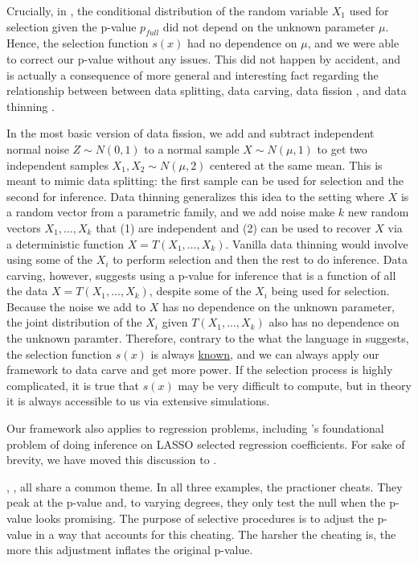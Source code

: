 \documentclass{article}
\begin{document}
Crucially, in , the conditional distribution of the random variable $X_1$ used for selection given the p-value $p_{full}$ did not depend on the unknown parameter $\mu$. Hence, the selection function $s(x)$ had no dependence on $\mu$, and we were able to correct our p-value without any issues. This did not happen by accident, and is actually a consequence of more general and interesting fact regarding the relationship between between data splitting, data carving, data fission \citep{Leiner}, and data thinning \citep{Dharamshi, Neufeld}.

In the most basic version of data fission, we add and subtract independent normal noise $Z \sim N(0, 1)$ to a normal sample $X \sim N(\mu, 1)$ to get two independent samples $X_1, X_2 \sim N(\mu, 2)$ centered at the same mean. This is meant to mimic data splitting: the first sample can be used for selection and the second for inference. Data thinning generalizes this idea to the setting where $X$ is a random vector from a parametric family, and we add noise make $k$ new random vectors $X_1, \dots, X_k$ that (1) are independent and (2) can be used to recover $X$ via a deterministic function $X = T(X_1, \dots, X_k)$. Vanilla data thinning would involve using some of the $X_i$ to perform selection and then the rest to do inference. Data carving, however, suggests using a p-value for inference that is a function of all the data $X = T(X_1, \dots, X_k)$, despite some of the $X_i$ being used for selection. Because the noise we add to $X$ has no dependence on the unknown parameter, the joint distribution of the $X_i$ given $T(X_1, \dots, X_k)$ also has no dependence on the unknown paramter. Therefore, contrary to the what the language in \cite{Leiner} suggests, the selection function $s(x)$ is always \underline{known}, and we can always apply our framework to data carve and get more power. If the selection process is highly complicated, it is true that $s(x)$ may be very difficult to compute, but in theory it is always accessible to us via extensive simulations. 

Our framework also applies to regression problems, including \cite{Lee}'s foundational problem of doing inference on LASSO selected regression coefficients. For sake of brevity, we have moved this discussion to .  

, ,  all share a common theme. In all three examples, the practioner cheats. They peak at the p-value and, to varying degrees, they only test the null when the p-value looks promising. The purpose of selective procedures is to adjust the p-value in a way that accounts for this cheating. The harsher the cheating is, the more this adjustment inflates the original p-value. 
\end{document}
